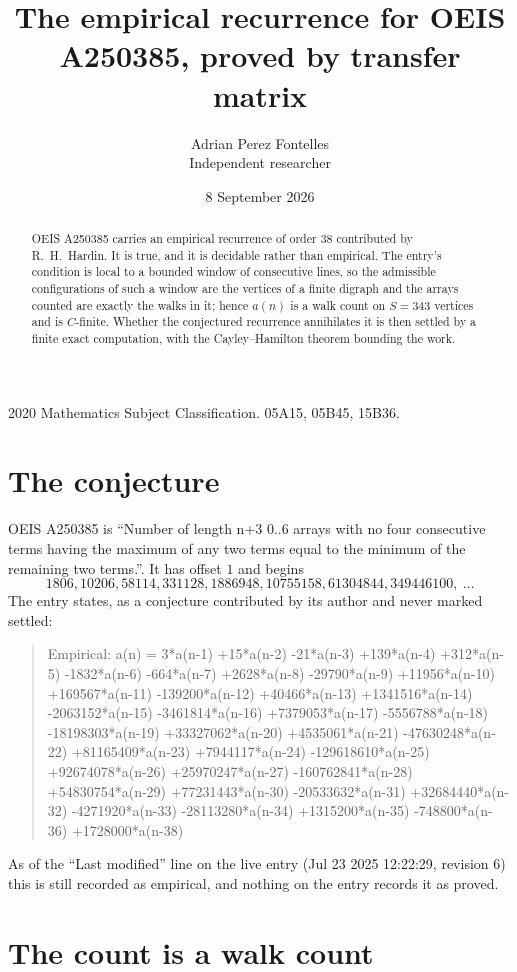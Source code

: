 \documentclass[11pt,a4paper]{article}
\title{The empirical recurrence for OEIS A250385, proved by transfer matrix}
\author{Adrian Perez Fontelles\\ \small Independent researcher}
\date{8 September 2026}
\theoremstyle{plain}
\theoremstyle{definition}
\begin{document}
\maketitle

\begin{abstract}
OEIS A250385 carries an empirical recurrence of order $38$ contributed by R.~H.~Hardin. It is
true, and it is decidable rather than empirical. The entry's condition is local to a bounded window of consecutive lines, so
the admissible configurations of such a window are the vertices of a finite digraph and the
arrays counted are exactly the walks in it; hence $a(n)$ is a walk count on $S=343$ vertices
and is $C$-finite. Whether the conjectured recurrence annihilates it is then settled by a
finite exact computation, with the Cayley--Hamilton theorem bounding the work.
\end{abstract}

\noindent\small 2020 Mathematics Subject Classification. 05A15, 05B45, 15B36.\normalsize

\section{The conjecture}

OEIS A250385 is ``Number of length n+3 0..6 arrays with no four consecutive terms having the maximum of any two terms equal to the minimum of the remaining two terms.''. It has offset $1$ and begins
\[
1806, 10206, 58114, 331128, 1886948, 10755158, 61304844, 349446100,\ \dots
\]
The entry states, as a conjecture contributed by its author and never marked settled:
\begin{quote}
Empirical: a(n) = 3*a(n-1) +15*a(n-2) -21*a(n-3) +139*a(n-4) +312*a(n-5) -1832*a(n-6) -664*a(n-7) +2628*a(n-8) -29790*a(n-9) +11956*a(n-10) +169567*a(n-11) -139200*a(n-12) +40466*a(n-13) +1341516*a(n-14) -2063152*a(n-15) -3461814*a(n-16) +7379053*a(n-17) -5556788*a(n-18) -18198303*a(n-19) +33327062*a(n-20) +4535061*a(n-21) -47630248*a(n-22) +81165409*a(n-23) +7944117*a(n-24) -129618610*a(n-25) +92674078*a(n-26) +25970247*a(n-27) -160762841*a(n-28) +54830754*a(n-29) +77231443*a(n-30) -20533632*a(n-31) +32684440*a(n-32) -4271920*a(n-33) -28113280*a(n-34) +1315200*a(n-35) -748800*a(n-36) +1728000*a(n-38)
\end{quote}
As of the ``Last modified'' line on the live entry (Jul 23 2025 12:22:29, revision 6) this is still
recorded as empirical, and nothing on the entry records it as proved.

\section{The count is a walk count}
\end{document}
